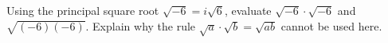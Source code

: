 Using the principal square root $\sqrt{-6}=i\sqrt6$, evaluate $\sqrt{-6}\cdot\sqrt{-6}$ and $\sqrt{(-6)(-6)}$. Explain why the rule $\sqrt a\cdot\sqrt b=\sqrt{ab}$ cannot be used here.
